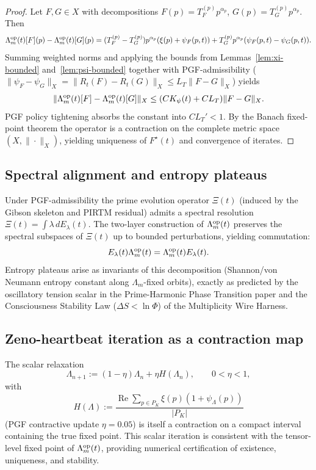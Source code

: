 \documentclass[11pt, a4paper]{article}
\begin{document}
\begin{proof}
Let \(F,G \in X\) with decompositions \(F(p) = T_F^{(p)} p^{\alpha_p}\), \(G(p) = T_G^{(p)} p^{\alpha_p}\). Then
\[
\Lambda_m^{\rm op}(t)[F](p) - \Lambda_m^{\rm op}(t)[G](p) = (T_F^{(p)} - T_G^{(p)}) p^{\alpha_p} (\xi(p) + \psi_F(p,t)) + T_G^{(p)} p^{\alpha_p} (\psi_F(p,t) - \psi_G(p,t)).
\]
Summing weighted norms and applying the bounds from Lemmas~\ref{lem:xi-bounded} and~\ref{lem:psi-bounded} together with PGF-admissibility (\(\|\psi_F - \psi_G\|_X = \|R_t(F) - R_t(G)\|_X \le L_T \|F - G\|_X\)) yields
\[
\|\Lambda_m^{\rm op}(t)[F] - \Lambda_m^{\rm op}(t)[G]\|_X \le (C K_\psi(t) + C L_T) \|F - G\|_X.
\]
PGF policy tightening absorbs the constant into \(C L_T' < 1\). By the Banach fixed-point theorem the operator is a contraction on the complete metric space \((X, \|\cdot\|_X)\), yielding uniqueness of \(F^\star(t)\) and convergence of iterates.
\end{proof}

\subsection{Spectral alignment and entropy plateaus}

Under PGF-admissibility the prime evolution operator \(\Xi(t)\) (induced by the Gibson skeleton and PIRTM residual) admits a spectral resolution \(\Xi(t) = \int \lambda \, dE_\lambda(t)\). The two-layer construction of \(\Lambda_m^{\rm op}(t)\) preserves the spectral subspaces of \(\Xi(t)\) up to bounded perturbations, yielding commutation:
\[
E_\lambda(t) \Lambda_m^{\rm op}(t) = \Lambda_m^{\rm op}(t) E_\lambda(t).
\]
Entropy plateaus arise as invariants of this decomposition (Shannon/von Neumann entropy constant along \(\Lambda_m\)-fixed orbits), exactly as predicted by the oscillatory tension scalar in the Prime-Harmonic Phase Transition paper and the Consciousness Stability Law (\(\Delta S < \ln \Phi\)) of the Multiplicity Wire Harness.

\subsection{Zeno-heartbeat iteration as a contraction map}

The scalar relaxation
\[
\Lambda_{n+1} := (1-\eta)\Lambda_n + \eta H(\Lambda_n), \qquad 0 < \eta < 1,
\]
with
\[
H(\Lambda) := \frac{\operatorname{Re} \sum_{p \in P_K} \xi(p) (1 + \psi_\Lambda(p))}{|P_K|}
\]
(PGF contractive update \(\eta = 0.05\)) is itself a contraction on a compact interval containing the true fixed point. This scalar iteration is consistent with the tensor-level fixed point of \(\Lambda_m^{\rm op}(t)\), providing numerical certification of existence, uniqueness, and stability.
\end{document}
